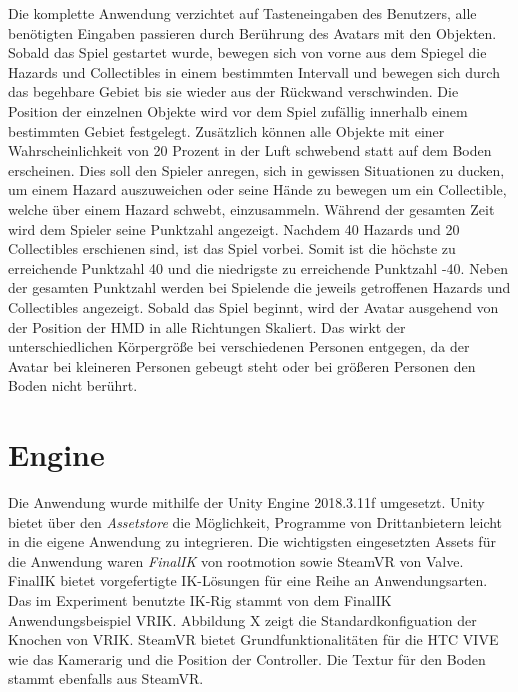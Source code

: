 Die komplette Anwendung verzichtet auf Tasteneingaben des Benutzers, alle benötigten Eingaben passieren durch Berührung des Avatars mit den Objekten.
Sobald das Spiel gestartet wurde, bewegen sich von vorne aus dem Spiegel die Hazards und Collectibles in einem bestimmten Intervall und bewegen sich durch das begehbare Gebiet bis sie wieder aus der Rückwand verschwinden. Die Position der einzelnen Objekte wird vor dem Spiel zufällig innerhalb einem bestimmten Gebiet festgelegt. Zusätzlich können alle Objekte mit einer Wahrscheinlichkeit von 20 Prozent in der Luft schwebend statt auf dem Boden erscheinen. Dies soll den Spieler anregen, sich in gewissen Situationen zu ducken, um einem Hazard auszuweichen oder seine Hände zu bewegen um ein Collectible, welche über einem Hazard schwebt, einzusammeln. Während der gesamten Zeit wird dem Spieler seine Punktzahl angezeigt. Nachdem 40 Hazards und 20 Collectibles erschienen sind, ist das Spiel vorbei. Somit ist die höchste zu erreichende Punktzahl 40 und die niedrigste zu erreichende Punktzahl -40. Neben der gesamten Punktzahl werden bei Spielende die jeweils getroffenen Hazards und Collectibles angezeigt.
Sobald das Spiel beginnt, wird der Avatar ausgehend von der Position der HMD in alle Richtungen Skaliert. Das wirkt der unterschiedlichen Körpergröße bei verschiedenen Personen entgegen, da der Avatar bei kleineren Personen gebeugt steht oder bei größeren Personen den Boden nicht berührt.


\section{Engine}
Die Anwendung wurde mithilfe der Unity Engine 2018.3.11f umgesetzt.
Unity bietet über den \textit{Assetstore} die Möglichkeit, Programme von Drittanbietern leicht in die eigene Anwendung zu integrieren. Die wichtigsten eingesetzten Assets für die Anwendung waren \textit{FinalIK} von rootmotion\cite{rootmotion} sowie SteamVR von Valve. FinalIK bietet vorgefertigte IK-Lösungen für eine Reihe an Anwendungsarten. Das im Experiment benutzte IK-Rig stammt von dem FinalIK Anwendungsbeispiel VRIK. Abbildung X zeigt die Standardkonfiguation der Knochen von VRIK. SteamVR bietet Grundfunktionalitäten für die HTC VIVE wie das Kamerarig und die Position der Controller. Die Textur für den Boden stammt ebenfalls aus SteamVR.


